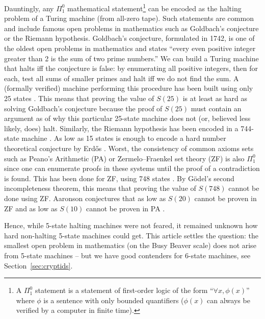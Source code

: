 \documentclass[a4paper,british]{article}
\theoremstyle{definition} %
\numberwithin{equation}{section}
\theoremstyle{definition} %
\begin{document}
Dauntingly, any $\Pi_1^0$ mathematical statement\footnote{A $\Pi_1^0$ statement is a statement of first-order logic of the form ``$\forall x, \phi(x)$'' where $\phi$ is a sentence with only bounded quantifiers (\ie $\phi(x)$ can always be verified by a computer in finite time).} can be encoded as the halting problem of a Turing machine (from all-zero tape). Such statements are common and include famous open problems in mathematics such as Goldbach's conjecture or the Riemann hypothesis. Goldbach's conjecture, formulated in 1742, is one of the oldest open problems in mathematics and states ``every even positive integer greater than 2 is the sum of two prime numbers.'' We can build a Turing machine that halts iff the conjecture is false: by enumerating all positive integers, then for each, test all sums of smaller primes and halt iff we do not find the sum. A (formally verified) machine performing this procedure has been built using only 25 states \cite{GoldbachTM27, GoldbachTM25}. This means that proving the value of $S(25)$ is at least as hard as solving Goldbach's conjecture because the proof of $S(25)$ must contain an argument as of why this particular 25-state machine does not (or, believed less likely, does) halt. Similarly, the Riemann hypothesis has been encoded in a 744-state machine \cite{RiemannTM,Yedidia2016,BusyBeaverFrontier}. As low as 15 states is enough to encode a hard number theoretical conjecture by Erd\H{o}s \cite{BB15}. Worst, the consistency of common axioms sets such as Peano's Arithmetic (PA) or Zermelo–Fraenkel set theory (ZF) is also $\Pi_1^0$ since one can enumerate proofs in these systems until the proof of a contradiction is found. This has been done for ZF, using 748 states \cite{ZFTM,Yedidia2016,BusyBeaverFrontier,BB748Thesis}. By G\"odel's second incompleteness theorem, this means that proving the value of $S(748)$ cannot be done using ZF. Aaronson conjectures that as low as $S(20)$ cannot be proven in ZF and as low as $S(10)$ cannot be proven in PA \cite{BusyBeaverFrontier}.

Hence, while 5-state halting machines were not feared, it remained unknown how hard non-halting 5-state machines could get. This article settles the question: the smallest open problem in mathematics (on the Busy Beaver scale) does not arise from 5-state machines -- but we have good contenders for 6-state machines, see Section~\ref{sec:cryptids}.
\end{document}

